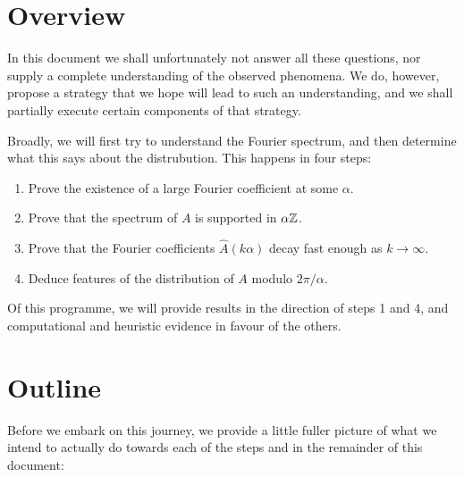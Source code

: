 \documentclass{report}
\theoremstyle{remark}
\numberwithin{equation}{section}
\begin{document}
\section{Overview}

In this document we shall unfortunately not answer all these
questions, nor supply a complete understanding of the observed
phenomena.  We do, however, propose a strategy that we hope will lead
to such an understanding, and we shall partially execute certain
components of that strategy.

Broadly, we will first try to understand the Fourier spectrum, and
then determine what this says about the distrubution.  This happens in
four steps:

\begin{enumerate}
  \item Prove the existence of a large Fourier coefficient at
    some $\alpha$.
  \item Prove that the spectrum of $A$ is supported in $\alpha \mathbb{Z}$.  
  \item Prove that the Fourier coefficients $\widehat{A}(k\alpha)$
    decay fast enough as $k \to \infty$.  
  \item Deduce features of the distribution of $A$ modulo
    $2\pi/\alpha$.
\end{enumerate}

Of this programme, we will provide results in the direction of steps 1
and 4, and computational and heuristic evidence in favour of the
others.

\section{Outline}

Before we embark on this journey, we provide a little fuller picture
of what we intend to actually do towards each of the steps and in the
remainder of this document: 
\end{document}
